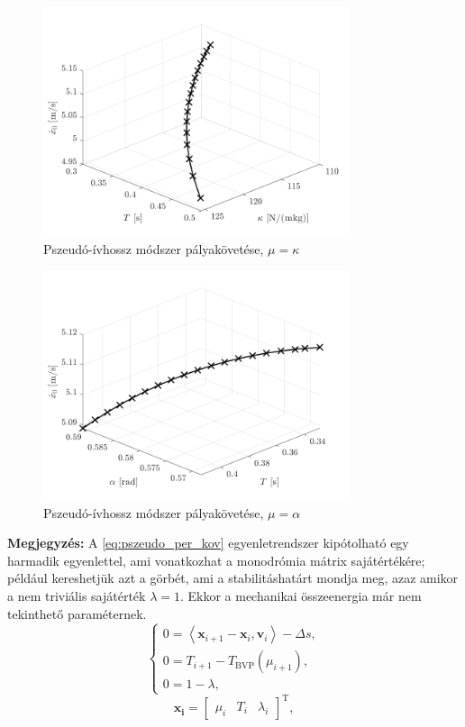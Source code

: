 \begin{figure}[ht]
	\centering
	\includegraphics[width=0.8\textwidth]{graphics/pszeudo_SLIP_kappa}
	\caption{Pszeudó-ívhossz módszer pályakövetése, $\mu = \kappa$}\label{fig:pszeudo_SLIP_kappa}
\end{figure}

\begin{figure}[ht]
	\centering
	\includegraphics[width=0.8\textwidth]{graphics/pszeudo_SLIP_alpha}
	\caption{Pszeudó-ívhossz módszer pályakövetése, $\mu = \alpha$}\label{fig:pszeudo_SLIP_alpha}
\end{figure}

\textbf{Megjegyzés:} A \eqref{eq:pszeudo_per_kov} egyenletrendszer kipótolható egy harmadik egyenlettel, ami vonatkozhat a monodrómia mátrix sajátértékére; például kereshetjük azt a görbét, ami a stabilitáshatárt mondja meg, azaz amikor a nem triviális sajátérték $\lambda = 1$. Ekkor a mechanikai összeenergia már nem tekinthető paraméternek.
\begin{equation}
\begin{cases}
0 = \left< \mathbf{x}_{i+1} - \mathbf{x}_i, \mathbf{v}_i \right> - \Delta s, \\
0 = T_{i+1} - T_{\mathrm{BVP}}(\mu_{i+1}), \\
0 = 1 - \lambda,
\end{cases}
\end{equation}
\begin{equation}
\mathbf{x_i}= \begin{bmatrix}
\mu_{i} & T_{i} & \lambda_i
\end{bmatrix}^\mathrm{T},
\end{equation}
